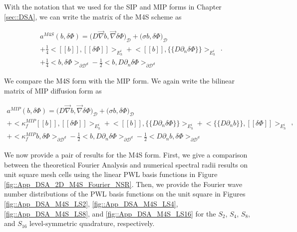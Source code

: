 With the notation that we used for the SIP and MIP forms in Chapter \ref{sec::DSA}, we can write the matrix of the M4S scheme as 

\begin{equation}
\label{eq::M4S_bilinear_form}
\begin{aligned}
a^{M4S}(b, \delta \Phi)  = \Big(  D \vec{\nabla} b , \vec{\nabla} \delta \Phi  \Big)_{\mathcal{D}} + \Big(  \sigma b , \delta \Phi  \Big)_{\mathcal{D}}    \\
+ \frac{1}{4}  \Big< [\![   b ]\!] , [\![  \delta \Phi ]\!]\Big>_{E_h^i} + \Big<  [\![  b ]\!] , \{\!\{  D \partial_n \delta \Phi \}\!\}\Big>_{E_h^i}   \\
+ \frac{1}{4} \Big<   b , \delta  \Phi \Big>_{\partial \mathcal{D}^d} - \frac{1}{2} \Big<  b ,  D \partial_n \delta \Phi \Big>_{\partial \mathcal{D}^d} 
\end{aligned} .
\end{equation}

\noindent 

We compare the M4S form with the MIP form. We again write the bilinear matrix of MIP diffusion form as

\begin{equation}
\label{eq::App_MIP_bilinear_form}
\begin{aligned}
a^{MIP}(b, \delta \Phi)  = \Big(  D \vec{\nabla} b , \vec{\nabla} \delta \Phi  \Big)_{\mathcal{D}} + \Big(  \sigma b , \delta \Phi  \Big)_{\mathcal{D}}    \\
+  \Big< \kappa_f^{MIP} [\![   b ]\!] , [\![  \delta \Phi ]\!]\Big>_{E_h^i} + \Big<  [\![  b ]\!] , \{\!\{  D \partial_n \delta \Phi \}\!\}\Big>_{E_h^i}  + \Big< \{\!\{  D \partial_n b \}\!\} , [\![ \delta \Phi ]\!]\Big>_{E_h^i} \\
+ \Big< \kappa_f^{MIP}  b , \delta  \Phi \Big>_{\partial \mathcal{D}^d} - \frac{1}{2} \Big<  b ,  D \partial_n \delta \Phi \Big>_{\partial \mathcal{D}^d} - \frac{1}{2} \Big<   D \partial_n b , \delta \Phi \Big>_{\partial \mathcal{D}^d}  
\end{aligned} ,
\end{equation}

\noindent 

We now provide a pair of results for the M4S form. First, we give a comparison between the theoretical Fourier Analysis and numerical spectral radii results on unit square mesh cells using the linear PWL basis functions in Figure \ref{fig::App_DSA_2D_M4S_Fourier_NSR}. Then, we provide the Fourier wave number distributions of the PWL basis functions on the unit square in Figures \ref{fig::App_DSA_M4S_LS2}, \ref{fig::App_DSA_M4S_LS4}, \ref{fig::App_DSA_M4S_LS8}, and \ref{fig::App_DSA_M4S_LS16} for the $S_2$, $S_4$, $S_8$, and $S_16$ level-symmetric quadrature, respectively.


